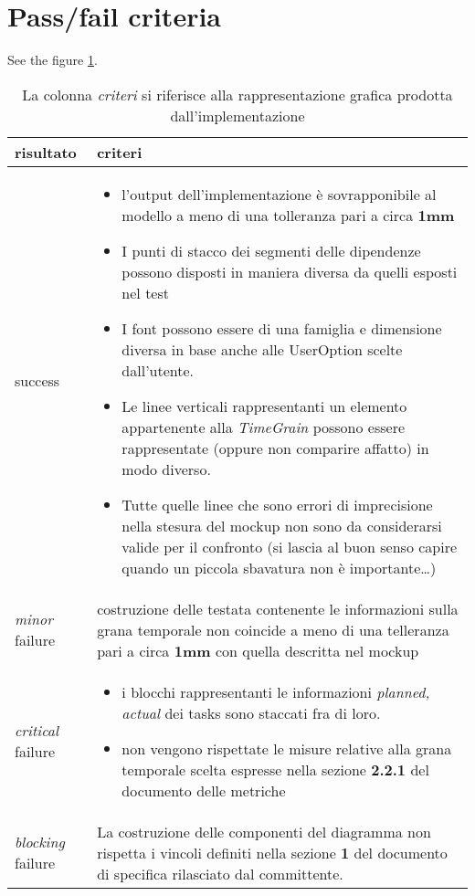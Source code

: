\section*{Pass/fail criteria}
See the figure \ref{table:passfailCriteriaGanttGeneration}.
\begin{table}[h!]
  \begin{center}
    \begin{tabular}{| l | p{100mm} |}
    \hline
    \textbf{risultato} & \textbf{criteri} \\
	\hline    
	success & 
    \begin{itemize}
  \item l'output dell'implementazione \`e sovrapponibile al modello a meno 
di una tolleranza pari a circa \textbf{1mm}
\item I punti di stacco dei segmenti
delle dipendenze possono disposti in maniera diversa da quelli esposti nel test
\item I font possono essere di una famiglia e dimensione diversa in base anche alle
UserOption scelte dall'utente.
\item Le linee verticali rappresentanti un elemento appartenente alla
\emph{TimeGrain} possono essere rappresentate (oppure non comparire affatto) in modo diverso.
\item Tutte quelle linee che sono errori di imprecisione nella stesura del mockup non
sono da considerarsi valide per il confronto (si lascia al buon senso capire
quando un piccola sbavatura non \`e importante\ldots)      
\end{itemize}
\\
    \hline
    \emph{minor} failure & costruzione delle testata contenente le informazioni
    sulla grana temporale non coincide a meno di una telleranza pari a circa 
    \textbf{1mm} con quella descritta nel mockup
    \\
    \hline
    \emph{critical} failure & 
    \begin{itemize}
    \item i blocchi rappresentanti le informazioni \emph{planned, actual} dei
    tasks sono staccati fra di loro. 
    \item non vengono rispettate le misure relative alla grana temporale
    scelta espresse nella sezione \textbf{2.2.1} del documento delle metriche 
    \end{itemize}\\
    \hline
    \emph{blocking} failure & La costruzione delle componenti del diagramma
    non rispetta i vincoli definiti nella sezione \textbf{1} del documento di 
   specifica rilasciato dal committente. \\
    \hline
    \end{tabular}
  \end{center}
	\caption{La colonna \emph{criteri} si riferisce alla rappresentazione grafica
	prodotta dall'implementazione}
	\label{table:passfailCriteriaGanttGeneration}
\end{table}